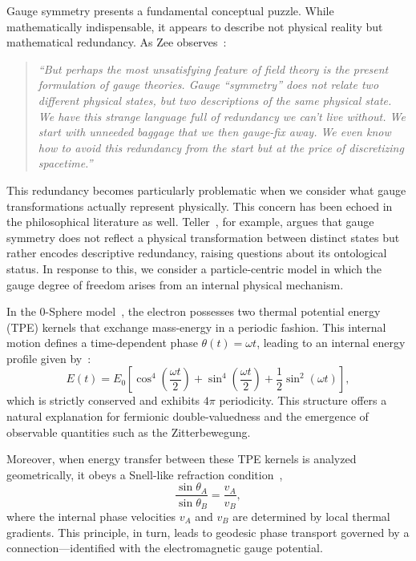 \documentclass[%
 reprint,
 amsmath,amssymb,
 aps,
]{revtex4-1}
\numberwithin{equation}{section}%
\begin{document}
Gauge symmetry presents a fundamental conceptual puzzle. While mathematically 
indispensable, it appears to describe not physical reality but mathematical 
redundancy. As Zee observes~\cite{zee2010}:
\begin{quote}
\textit{``But perhaps the most unsatisfying feature of field theory is the present formulation of gauge theories. Gauge ``symmetry'' does not relate two different physical states, but two descriptions of the same physical state. We have this strange language full of redundancy we can't live without. We start with unneeded baggage that we then gauge-fix away. We even know how to avoid this redundancy from the start but at the price of discretizing spacetime.''}
\end{quote}

This redundancy becomes particularly problematic when we consider what gauge 
transformations actually represent physically. This concern has been echoed in the philosophical literature as well. Teller~\cite{teller2000}, for example, argues that gauge symmetry does not reflect a physical transformation between distinct states but rather encodes descriptive redundancy, raising questions about its ontological status. In response to this, we consider a particle-centric model in which the gauge degree of freedom arises from an internal physical mechanism.

In the 0-Sphere model~\cite{hanamura2018}, the electron possesses two thermal potential energy (TPE) kernels that exchange mass-energy in a periodic fashion. This internal motion defines a time-dependent phase $\theta(t) = \omega t$, leading to an internal energy profile given by~\cite{hanamura2024quantum}:
\begin{equation}
E(t) = E_0 \left[ \cos^4\left( \frac{\omega t}{2} \right) + \sin^4\left( \frac{\omega t}{2} \right) + \frac{1}{2} \sin^2(\omega t) \right],
\label{eq:internal_energy}
\end{equation}
which is strictly conserved and exhibits $4\pi$ periodicity. This structure offers a natural explanation for fermionic double-valuedness and the emergence of observable quantities such as the Zitterbewegung.

Moreover, when energy transfer between these TPE kernels is analyzed geometrically, it obeys a Snell-like refraction condition~\cite{hanamura2024quantum},
\begin{equation}
\frac{\sin \theta_A}{\sin \theta_B} = \frac{v_A}{v_B},
\label{eq:snell}
\end{equation}
where the internal phase velocities $v_A$ and $v_B$ are determined by local thermal gradients. This principle, in turn, leads to geodesic phase transport governed by a connection—identified with the electromagnetic gauge potential.
\end{document}
